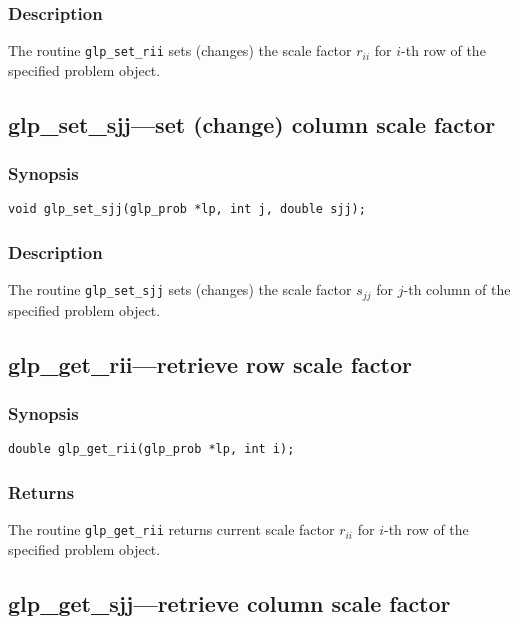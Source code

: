 \subsubsection*{Description}

The routine \verb|glp_set_rii| sets (changes) the scale factor $r_{ii}$
for $i$-th row of the specified problem object.

\subsection{glp\_set\_sjj---set (change) column scale factor}

\subsubsection*{Synopsis}

\begin{verbatim}
void glp_set_sjj(glp_prob *lp, int j, double sjj);
\end{verbatim}

\subsubsection*{Description}

The routine \verb|glp_set_sjj| sets (changes) the scale factor $s_{jj}$
for $j$-th column of the specified problem object.

\subsection{glp\_get\_rii---retrieve row scale factor}

\subsubsection*{Synopsis}

\begin{verbatim}
double glp_get_rii(glp_prob *lp, int i);
\end{verbatim}

\subsubsection*{Returns}

The routine \verb|glp_get_rii| returns current scale factor $r_{ii}$ for
$i$-th row of the specified problem object.

\subsection{glp\_get\_sjj---retrieve column scale factor}

